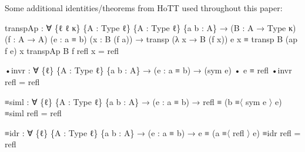 \documentclass[
  11pt,
  oneside,
  article]{memoir}
\newenvironment{Shaded}{}{}
\newcommand{\NormalTok}[1]{#1}
\newcommand{\OtherTok}[1]{\textcolor[rgb]{0.00,0.44,0.13}{#1}}
\theoremstyle{definition}
\theoremstyle{plain}
\newcommand{\0}{\textsf{0}}
\newcommand{\1}{\tn{\textsf{1}}}
\begin{document}
Some additional identities/theorems from HoTT used throughout this
paper:

\begin{Shaded}
\begin{Highlighting}[]
\NormalTok{transpAp }\OtherTok{:} \OtherTok{∀} \OtherTok{\{}\NormalTok{ℓ ℓ\textquotesingle{} κ}\OtherTok{\}} \OtherTok{\{}\NormalTok{A }\OtherTok{:}\NormalTok{ Type ℓ}\OtherTok{\}} \OtherTok{\{}\NormalTok{A\textquotesingle{} }\OtherTok{:}\NormalTok{ Type ℓ\textquotesingle{}}\OtherTok{\}} \OtherTok{\{}\NormalTok{a b }\OtherTok{:}\NormalTok{ A}\OtherTok{\}}
           \OtherTok{→} \OtherTok{(}\NormalTok{B }\OtherTok{:}\NormalTok{ A\textquotesingle{} }\OtherTok{→}\NormalTok{ Type κ}\OtherTok{)} \OtherTok{(}\NormalTok{f }\OtherTok{:}\NormalTok{ A }\OtherTok{→}\NormalTok{ A\textquotesingle{}}\OtherTok{)} \OtherTok{(}\NormalTok{e }\OtherTok{:}\NormalTok{ a ≡ b}\OtherTok{)} \OtherTok{(}\NormalTok{x }\OtherTok{:}\NormalTok{ B }\OtherTok{(}\NormalTok{f a}\OtherTok{))}
           \OtherTok{→}\NormalTok{ transp }\OtherTok{(λ}\NormalTok{ x }\OtherTok{→}\NormalTok{ B }\OtherTok{(}\NormalTok{f x}\OtherTok{))}\NormalTok{ e x ≡ transp B }\OtherTok{(}\NormalTok{ap f e}\OtherTok{)}\NormalTok{ x}
\NormalTok{transpAp B f refl x }\OtherTok{=}\NormalTok{ refl}

\NormalTok{•invr }\OtherTok{:} \OtherTok{∀} \OtherTok{\{}\NormalTok{ℓ}\OtherTok{\}} \OtherTok{\{}\NormalTok{A }\OtherTok{:}\NormalTok{ Type ℓ}\OtherTok{\}} \OtherTok{\{}\NormalTok{a b }\OtherTok{:}\NormalTok{ A}\OtherTok{\}}
        \OtherTok{→} \OtherTok{(}\NormalTok{e }\OtherTok{:}\NormalTok{ a ≡ b}\OtherTok{)} \OtherTok{→} \OtherTok{(}\NormalTok{sym e}\OtherTok{)}\NormalTok{ • e ≡ refl}
\NormalTok{•invr refl }\OtherTok{=}\NormalTok{ refl}

\NormalTok{≡siml }\OtherTok{:} \OtherTok{∀} \OtherTok{\{}\NormalTok{ℓ}\OtherTok{\}} \OtherTok{\{}\NormalTok{A }\OtherTok{:}\NormalTok{ Type ℓ}\OtherTok{\}} \OtherTok{\{}\NormalTok{a b }\OtherTok{:}\NormalTok{ A}\OtherTok{\}}
        \OtherTok{→} \OtherTok{(}\NormalTok{e }\OtherTok{:}\NormalTok{ a ≡ b}\OtherTok{)} \OtherTok{→}\NormalTok{ refl ≡ }\OtherTok{(}\NormalTok{b ≡〈 sym e 〉 e}\OtherTok{)}
\NormalTok{≡siml refl }\OtherTok{=}\NormalTok{ refl}

\NormalTok{≡idr }\OtherTok{:} \OtherTok{∀} \OtherTok{\{}\NormalTok{ℓ}\OtherTok{\}} \OtherTok{\{}\NormalTok{A }\OtherTok{:}\NormalTok{ Type ℓ}\OtherTok{\}} \OtherTok{\{}\NormalTok{a b }\OtherTok{:}\NormalTok{ A}\OtherTok{\}}
       \OtherTok{→} \OtherTok{(}\NormalTok{e }\OtherTok{:}\NormalTok{ a ≡ b}\OtherTok{)} \OtherTok{→}\NormalTok{ e ≡ }\OtherTok{(}\NormalTok{a ≡〈 refl 〉 e}\OtherTok{)}
\NormalTok{≡idr refl }\OtherTok{=}\NormalTok{ refl}


\end{Highlighting}
\end{Shaded}
\end{document}
